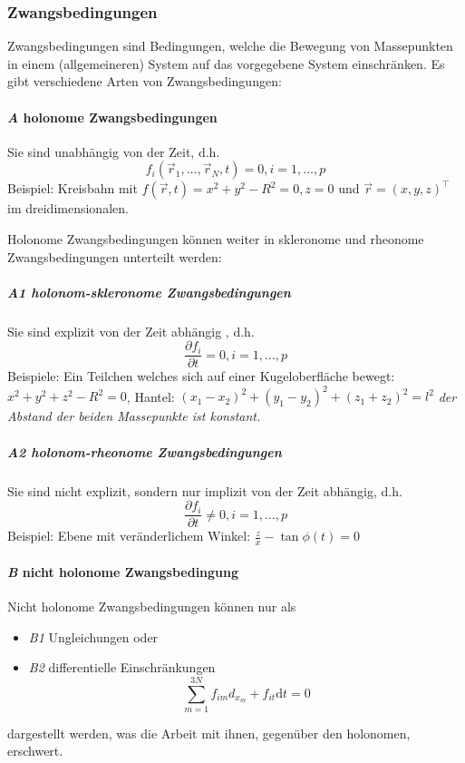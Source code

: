\documentclass[oneside]{book}
\theoremstyle{definition}
\renewcommand{\d}{\mathrm d}
\begin{document}
\subsubsection{Zwangsbedingungen} 
Zwangsbedingungen sind Bedingungen, welche die Bewegung von Massepunkten in einem (allgemeineren) System auf das vorgegebene System einschränken. Es gibt verschiedene Arten von Zwangsbedingungen:

\paragraph{\textit{A} holonome Zwangsbedingungen} Sie sind unabhängig von der Zeit, d.h. $$f_i(\vec{r}_1, \dots, \vec{r}_N, t) = 0, i = 1, \dots, p$$ 
Beispiel: Kreisbahn mit $f(\vec{r}, t) = x^2 + y^2 - R^2 = 0, z = 0$ und $\vec{r} = (x,y,z)^\top$ im dreidimensionalen.

Holonome Zwangsbedingungen können weiter in skleronome und rheonome Zwangsbedingungen unterteilt werden:

\subparagraph{\textit{A1} holonom-skleronome Zwangsbedingungen} Sie sind explizit von der Zeit abhängig , d.h.
$$ \frac{\partial f_i}{\partial t} = 0, i = 1, \dots, p$$
Beispiele: Ein Teilchen welches sich auf einer Kugeloberfläche bewegt: $x^2 + y^2 + z^2 - R^2 = 0$, Hantel: $(x_1 - x_2)^2 + (y_1 - y_2)^2 + (z_1 + z_2)^2 = l^2$ \textit{der Abstand der beiden Massepunkte ist konstant.}

\subparagraph{\textit{A2} holonom-rheonome Zwangsbedingungen} Sie sind nicht explizit, sondern nur implizit von der Zeit abhängig, d.h.
$$ \frac{\partial f_i}{\partial t} \neq 0, i = 1, \dots, p$$
Beispiel: Ebene mit veränderlichem Winkel: $\frac{z}{x} - \tan{\phi(t)} = 0$


\paragraph{\textit{B} nicht holonome Zwangsbedingung}
Nicht holonome Zwangsbedingungen können nur als 
\begin{itemize}
	\item \textit{B1} Ungleichungen oder
	\item \textit{B2} differentielle Einschränkungen
	$$ \sum_{m = 1}^{3N} f_{im} d_{x_m} + f_{it} \d t = 0$$
\end{itemize}
dargestellt werden, was die Arbeit mit ihnen, gegenüber den holonomen, erschwert. 
\end{document}
